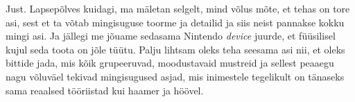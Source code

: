 
Just. Lapsepõlves kuidagi, ma mäletan selgelt, mind võlus mõte, et tehas on tore asi, sest et ta võtab mingisuguse toorme ja detailid ja siis neist pannakse kokku mingi asi. Ja jällegi me jõuame sedasama  Nintendo \emph{device} juurde, et füüsilisel kujul seda toota on jõle tüütu. Palju lihtsam oleks teha seesama asi nii, et oleks bittide jada, mis kõik grupeeruvad, moodustavaid mustreid ja sellest peaaegu nagu võluväel tekivad mingisugused asjad, mis inimestele tegelikult on tänaseks sama reaalsed tööriistad kui haamer ja höövel.
